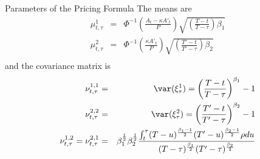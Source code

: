 {Parameters of the Pricing Formula}
The means are
\begin{eqnarray}\nonumber
\mu^1_{t,\tau} &=& \Phi^{-1}\left(\frac{A_t - \kappa A'_t}{P}\right) \sqrt{\left(\frac{T-t}{T-\tau}\right)\beta_1}\\\nonumber
\mu^2_{t,\tau} &=& \Phi^{-1}\left(\frac{\kappa A'_t}{P}\right) \sqrt{\left(\frac{T'-t}{T'-\tau}\right)\beta_2}\\\nonumber
\end{eqnarray}
and the covariance matrix is
\begin{eqnarray}\nonumber
\nu^{1,1}_{t,\tau} &=& \var(\xi_\tau^1) =  \left(\frac{T-t}{T-\tau}\right)^{\beta_1}-1\\\nonumber
\nu^{2,2}_{t,\tau} &=& \var(\xi_\tau^2) =  \left(\frac{T'-t}{T'-\tau}\right)^{\beta_2}-1\\\nonumber
\nu^{1,2}_{t,\tau}= \nu^{2,1}_{t,\tau} &=& \beta_1^\frac{1}{2}\beta_2^\frac{1}{2}
\frac{\int_t^\tau (T-u)^\frac{\beta_1-1}{2} (T'-u)^\frac{\beta_2-1}{2} \rho du}{(T-\tau)^\frac{\beta_1}{2} (T'-\tau)^\frac{\beta_2}{2}} \\\nonumber
\end{eqnarray}

